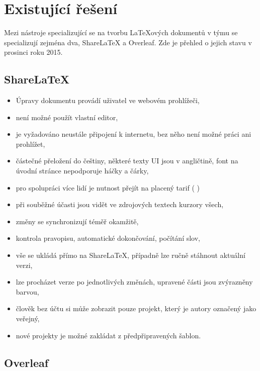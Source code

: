 \section{Existující řešení}

Mezi nástroje specializující se na tvorbu \LaTeX{ových} dokumentů v týmu se specializují zejména dva, ShareLaTeX a Overleaf. Zde je přehled o jejich stavu v prosinci roku 2015.

\subsection{ShareLaTeX}

\begin{itemize}
	\item Úpravy dokumentu provádí uživatel ve webovém prohlížeči,
	\item není možné použít vlastní editor,
	\item je vyžadováno neustále připojení k internetu, bez něho není možné práci ani prohlížet,
	\item částečné přeložení do češtiny, některé texty UI jsou v angličtině, font na úvodní stránce nepodporuje háčky a čárky,
	\item pro spolupráci více lidí je nutnost přejít na placený tarif ( \cite{sharelatex-pricing})
	\item při souběžné účasti jsou vidět ve zdrojových textech kurzory všech,
	\item změny se synchronizují téměř okamžitě,
	\item kontrola pravopisu, automatické dokončování, počítání slov,
	\item vše se ukládá přímo na ShareLaTeX, případně lze ručně stáhnout aktuální verzi,
	\item lze procházet verze po jednotlivých změnách, upravené části jsou zvýrazněny barvou,
	\item člověk bez účtu si může zobrazit pouze projekt, který je autory označený jako veřejný,
	\item nové projekty je možné zakládat z předpřipravených šablon.
\end{itemize}


\subsection{Overleaf}

